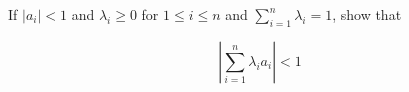 If $|a_i|<1$ and $\lambda_i\geq0$ for $1\leq i\leq n$ and $\sum_{i=1}^n\lambda_i=1$, show that

$$|\sum_{i=1}^n\lambda_ia_i|<1$$

\begin{solution}\renewcommand{\qedsymbol}{}\ \\

    

\end{solution}